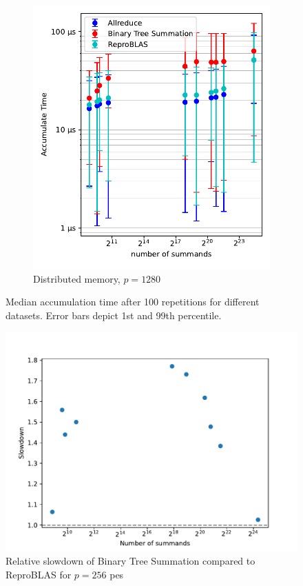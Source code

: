 \begin{figure}
\begin{subfigure}{0.49\textwidth}
\includegraphics[scale=0.72]{figures/benchmarkScatter1280.pdf}
\caption{Distributed memory, $p=1280$}
\label{fig:benchmarkOverview1280}
\end{subfigure}

\caption{Median accumulation time after 100 repetitions for different datasets. Error bars depict 1st and 99th percentile.}
\label{fig:benchmarkOverview}
\end{figure}

\begin{figure}
\centering
\includegraphics[scale=0.75]{figures/slowdownPlot.pdf}
\caption{Relative slowdown of Binary Tree Summation compared to ReproBLAS for $p=256$ \glspl{pe}}
\label{fig:slowdownPlot}
\end{figure}

